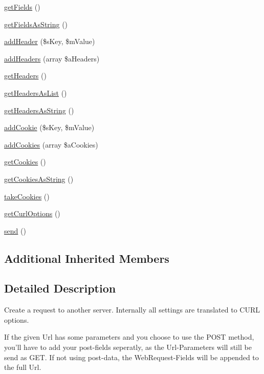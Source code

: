 \begin{DoxyCompactItemize}
\item 
\hyperlink{class_web_request_a059d6e3520bdf93d35103a4f9f0e64c5}{get\-Fields} ()
\item 
\hyperlink{class_web_request_a5bd1b93e68c0292c12b773f96e7334f9}{get\-Fields\-As\-String} ()
\item 
\hyperlink{class_web_request_ac87d20c6f1f342b60404dc49b896746c}{add\-Header} (\$s\-Key, \$m\-Value)
\item 
\hyperlink{class_web_request_a9c9836cf9e28eb36a2f2b9d361b2e560}{add\-Headers} (array \$a\-Headers)
\item 
\hyperlink{class_web_request_a97a06cf3c8df21c1ff76ca5da481181e}{get\-Headers} ()
\item 
\hyperlink{class_web_request_a542293a1b540e25fae23c6600b70be6f}{get\-Headers\-As\-List} ()
\item 
\hyperlink{class_web_request_a19307f30cfb4dc585c363a75863384d0}{get\-Headers\-As\-String} ()
\item 
\hyperlink{class_web_request_a45a1c1112a6cf0cb9538234b58158364}{add\-Cookie} (\$s\-Key, \$m\-Value)
\item 
\hyperlink{class_web_request_a6097771b7ebc10f5f33db0d494671404}{add\-Cookies} (array \$a\-Cookies)
\item 
\hyperlink{class_web_request_a23917aa9ad5587e0438079922ea1c7e0}{get\-Cookies} ()
\item 
\hyperlink{class_web_request_a09a2d42a5836ecf11540e2b9a75186ad}{get\-Cookies\-As\-String} ()
\item 
\hyperlink{class_web_request_a10c9c7cd782bc1084e9da4bfef6617f3}{take\-Cookies} ()
\item 
\hyperlink{class_web_request_a87858affa5dc5bdcad534ef9324cfeaf}{get\-Curl\-Options} ()
\item 
\hyperlink{class_web_request_a6e57fabfb9dfe3c8032d61c24174492b}{send} ()
\end{DoxyCompactItemize}
\subsection*{Additional Inherited Members}


\subsection{Detailed Description}
Create a request to another server. Internally all settings are translated to C\-U\-R\-L options.

If the given Url has some parameters and you choose to use the P\-O\-S\-T method, you'll have to add your post-\/fields seperatly, as the Url-\/\-Parameters will still be send as G\-E\-T. If not using post-\/data, the Web\-Request-\/\-Fields will be appended to the full Url.

